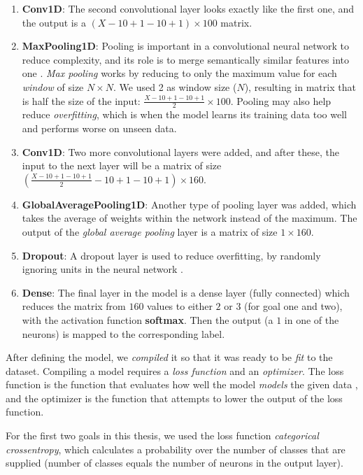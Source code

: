 \begin{enumerate}
      \item \textbf{Conv1D}: The second convolutional layer looks exactly like the first one, and the output is a $(X-10+1-10+1) \times 100$ matrix. 
      \item \textbf{MaxPooling1D}: Pooling is important in a convolutional neural network to reduce complexity, and its role is to merge semantically similar features into one \cite{deep_learning}. 
            \textit{Max pooling} works by reducing to only the maximum value for each \textit{window} of size $N \times N$. We used 2 as 
            window size ($N$), resulting in matrix that is half the size of the input: $ \frac{X-10+1-10+1}{2} \times 100$. 
            Pooling may also help reduce \textit{overfitting}, which is when the model learns its training data too well and performs worse on unseen data.
      \item \textbf{Conv1D}: Two more convolutional layers were added, and after these, the input to the next layer will be a matrix of size
            $ \left( \frac{X-10+1-10+1}{2}-10+1-10+1 \right) \times 160 $.
      \item \textbf{GlobalAveragePooling1D}: Another type of pooling layer was added, which takes the average of weights within the network instead of the maximum.
            The output of the \textit{global average pooling} layer is a matrix of size $ 1 \times 160 $.
      \item \textbf{Dropout}: A dropout layer is used to reduce overfitting, by randomly ignoring units in the neural network \cite{dropout}. 
      \item \textbf{Dense}: The final layer in the model is a dense layer (fully connected) which reduces the matrix from $160$ values to 
            either $2$ or $3$ (for goal one and two), with the activation function \textbf{softmax}. 
            Then the output (a $1$ in one of the neurons) is mapped to the corresponding label.
\end{enumerate}

After defining the model, we \textit{compiled} it so that it was ready to be \textit{fit} to the dataset. Compiling a model requires a \textit{loss function} and an \textit{optimizer}. The loss function is the function that evaluates how well the model \textit{models} the given data \cite{loss_functions}, and the optimizer is the function that attempts to lower the output of the loss function. 

For the first two goals in this thesis, we used the loss function \textit{categorical crossentropy}, which calculates a probability over the number of classes that are supplied (number of classes equals the number of neurons in the output layer). 

